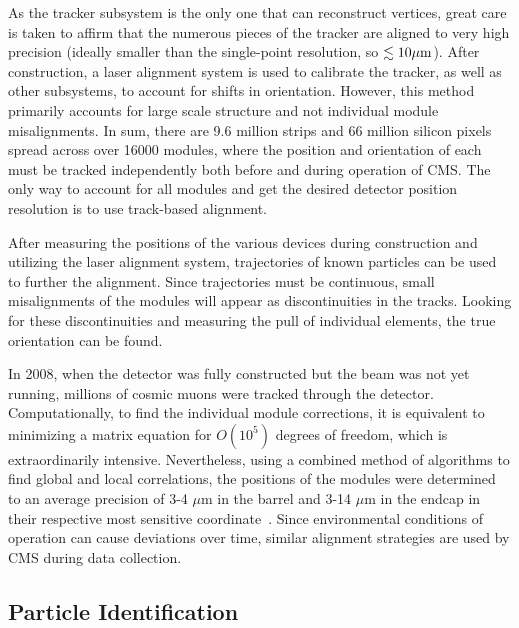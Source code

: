 As the tracker subsystem is the only one that can reconstruct vertices, great care is taken to affirm that the numerous pieces of the tracker are aligned to very high precision (ideally smaller than the single-point resolution, so $\lesssim10\mu\rm{m}$). After construction, a laser alignment system is used to calibrate the tracker, as well as other subsystems, to account for shifts in orientation. However, this method primarily accounts for large scale structure and not individual module misalignments. In sum, there are 9.6 million strips and 66 million silicon pixels spread across over 16000 modules, where the position and orientation of each must be tracked independently both before and during operation of CMS. The only way to account for all modules and get the desired detector position resolution is to use track-based alignment.

After measuring the positions of the various devices during construction and utilizing the laser alignment system, trajectories of known particles can be used to further the alignment. Since trajectories must be continuous, small misalignments of the modules will appear as discontinuities in the tracks. Looking for these discontinuities and measuring the pull of individual elements, the true orientation can be found.

In 2008, when the detector was fully constructed but the beam was not yet running, millions of cosmic muons were tracked through the detector. Computationally, to find the individual module corrections, it is equivalent to minimizing a matrix equation for $O(10^5)$ degrees of freedom, which is extraordinarily intensive. Nevertheless, using a combined method of algorithms to find global and local correlations, the positions of the modules were determined to an average precision of 3-4 $\mu$m in the barrel and 3-14 $\mu$m in the endcap in their respective most sensitive coordinate~\cite{Chatrchyan:2009sr}. Since environmental conditions of operation can cause deviations over time, similar alignment strategies are used by CMS during data collection.

\subsection{Particle Identification}
\label{sec:ParticleID}

